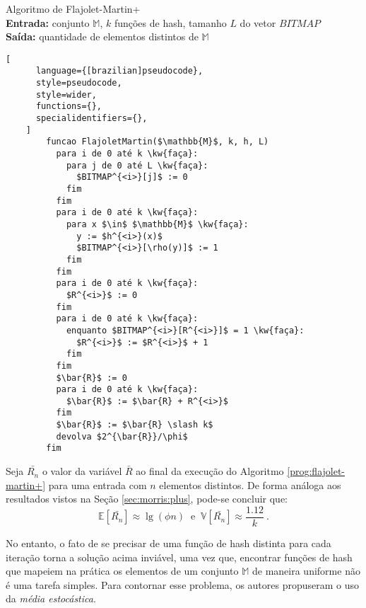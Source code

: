 \begin{programruledcaption}{
  Algoritmo de Flajolet-Martin+
  \\ \textbf{Entrada:} conjunto $\mathbb{M}$, $k$ funções de hash, tamanho $L$ do vetor $BITMAP$ 
  \\ \textbf{Saída:} quantidade de elementos distintos de $\mathbb{M}$
  \label{prog:flajolet-martin+}
  }
    \begin{lstlisting}[
      language={[brazilian]pseudocode},
      style=pseudocode,
      style=wider,
      functions={},
      specialidentifiers={},
    ]
        funcao FlajoletMartin($\mathbb{M}$, k, h, L)
          para i de 0 até k \kw{faça}:
            para j de 0 até L \kw{faça}:
              $BITMAP^{<i>}[j]$ := 0
            fim
          fim
          para i de 0 até k \kw{faça}:
            para x $\in$ $\mathbb{M}$ \kw{faça}:
              y := $h^{<i>}(x)$
              $BITMAP^{<i>}[\rho(y)]$ := 1
            fim
          fim
          para i de 0 até k \kw{faça}:
            $R^{<i>}$ := 0
          fim
          para i de 0 até k \kw{faça}:
            enquanto $BITMAP^{<i>}[R^{<i>}]$ = 1 \kw{faça}:
              $R^{<i>}$ := $R^{<i>}$ + 1
            fim
          fim
          $\bar{R}$ := 0
          para i de 0 até k \kw{faça}:
            $\bar{R}$ := $\bar{R} + R^{<i>}$ 
          fim
          $\bar{R}$ := $\bar{R} \slash k$
          devolva $2^{\bar{R}}/\phi$
        fim
    \end{lstlisting}
  \end{programruledcaption}

Seja $\bar{R_n}$ o valor da variável $\bar{R}$ ao final da execução do Algoritmo \ref{prog:flajolet-martin+} para uma
entrada com $n$ elementos distintos. De forma análoga aos resultados vistos na Seção \ref{sec:morris:plus}, pode-se
concluir que:
\[ \mathbb{E}[\bar{R_n}] \approx \lg(\phi n)  \; \; \text{e}  \; \; \mathbb{V}[\bar{R_n}] \approx \frac{1.12}{k} \ . \]


No entanto, o fato de se precisar de uma função de hash distinta para cada iteração torna a solução acima inviável, 
uma vez que, encontrar funções de hash que mapeiem na prática os elementos de um conjunto $\mathbb{M}$ de maneira
uniforme não é uma tarefa simples. Para contornar esse problema, os autores propuseram o uso da 
\textit{média estocástica}.

